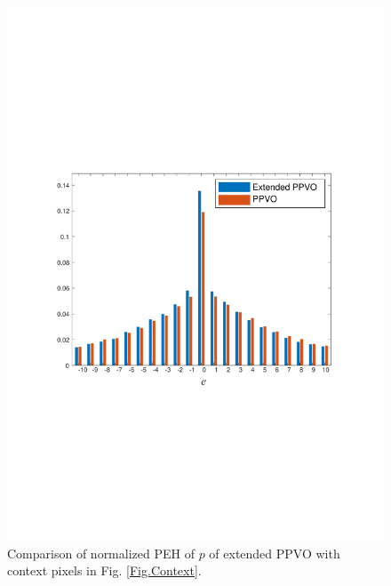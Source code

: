 \documentclass[review,3p,10pt,sort&compress]{elsarticle}
\begin{document}
\begin{figure}
{\begin{minipage}[t]{0.4\linewidth}
    \includegraphics[width=1\textwidth]{figures/Comparison/8Pixels/baboon1.pdf}
    \end{minipage}
}
\centering
\caption{Comparison of normalized PEH of $p$ of extended PPVO with context pixels in Fig. \ref{Fig.Context}.}
\label{Fig.ComparisonEPPVO}
\end{figure}
\end{document}
